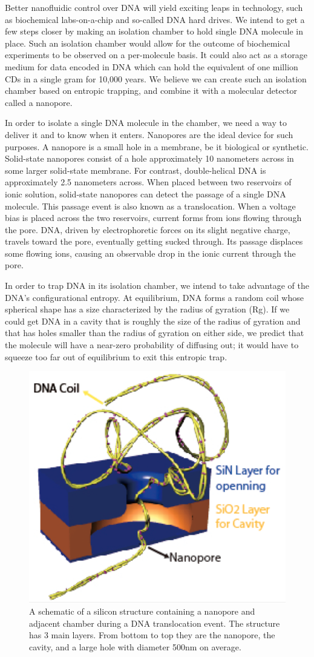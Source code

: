 \documentclass[aps,prl,preprint,groupedaddress]{revtex4}
\begin{document}
Better nanofluidic control over DNA will yield exciting leaps in technology, such as biochemical labs-on-a-chip and so-called DNA hard drives.
We intend to get a few steps closer by making an isolation chamber to hold single DNA molecule in place.
Such an isolation chamber would allow for the outcome of biochemical experiments to be observed on a per-molecule basis.
It could also act as a storage medium for data encoded in DNA which can hold the equivalent of one million CDs in a single gram for 10,000 years\cite{dna-hard-drive}.
We believe we can create such an isolation chamber based on entropic trapping, and combine it with a molecular detector called a nanopore.

In order to isolate a single DNA molecule in the chamber, we need a way to deliver it and to know when it enters.
Nanopores are the ideal device for such purposes.
A nanopore is a small hole in a membrane, be it biological or synthetic.
Solid-state nanopores consist of a hole approximately 10 nanometers across in some larger solid-state membrane.
For contrast, double-helical DNA is approximately 2.5 nanometers across.
When placed between two reservoirs of ionic solution, solid-state nanopores can detect the passage of a single DNA molecule.
This passage event is also known as a translocation.
When a voltage bias is placed across the two reservoirs, current forms from ions flowing through the pore.
DNA, driven by electrophoretic forces on its slight negative charge, travels toward the pore, eventually getting sucked through.
Its passage displaces some flowing ions, causing an observable drop in the ionic current through the pore.

In order to trap DNA in its isolation chamber, we intend to take advantage of the DNA’s configurational entropy.
At equilibrium, DNA forms a random coil whose spherical shape has a size characterized by the radius of gyration (Rg).
If we could get DNA in a cavity that is roughly the size of the radius of gyration and that has holes smaller than the radius of gyration on either side, we predict that the molecule will have a near-zero probability of diffusing out; it would have to squeeze too far out of equilibrium to exit this entropic trap.\cite{trapping}

\begin{figure}
\centering
\includegraphics[width=.4\textwidth]{figures/nanopore-schematic}
\caption{A schematic of a silicon structure containing a nanopore and adjacent chamber during a DNA translocation event.
The structure has 3 main layers.
From bottom to top they are the nanopore, the cavity, and a large hole with diameter 500nm on average.}
\label{fig:nanopore-schematic}
\end{figure}
\end{document}
